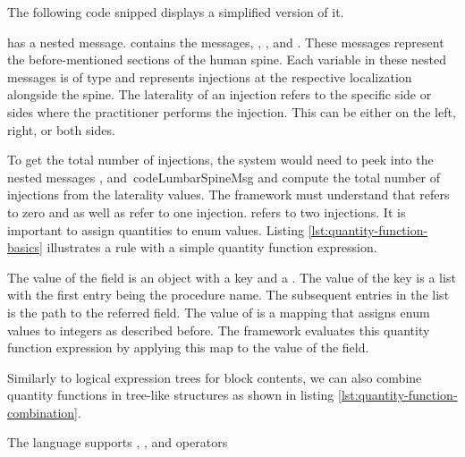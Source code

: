 The following code snipped displays a simplified version of it.



 has a nested message.
 contains the messages, , , and .
These messages represent the before-mentioned sections of the human spine.
Each variable in these nested messages is of type  and represents injections at the respective localization alongside the spine.
The laterality of an injection refers to the specific side or sides where the practitioner performs the injection.
This can be either on the left, right, or both sides.

To get the total number of injections, the system would need to peek into the nested messages ,  and\ code{LumbarSpineMsg} and compute the total number of injections from the laterality values.
The framework must understand that  refers to zero and  as well as refer to one injection.
 refers to two injections.
It is important to assign quantities to enum values.
Listing \ref{lst:quantity-function-basics} illustrates a rule with a simple quantity function expression.

The value of the  field is an object with a  key and a .
The value of the  key is a list with the first entry being the procedure name.
The subsequent entries in the list is the path to the referred field.
The value of  is a mapping that assigns enum values to integers as described before.
The framework evaluates this quantity function expression by applying this map to the value of the  field.

Similarly to logical expression trees for block contents, we can also combine quantity functions in tree-like structures as shown in listing \ref{lst:quantity-function-combination}.

The language supports , ,  and  operators

